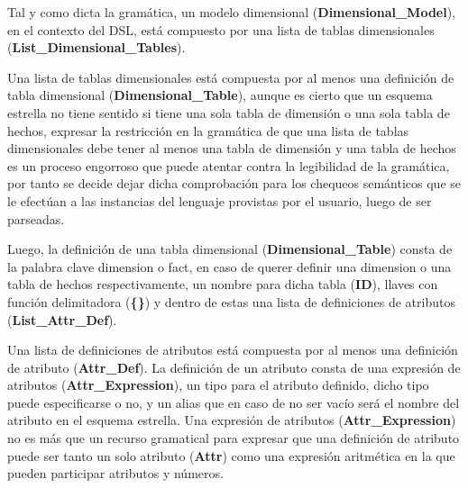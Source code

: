 
Tal y como dicta la gramática, un modelo dimensional (\textbf{Dimensional\_Model}), 
en el contexto del DSL, est\'a compuesto por una lista de tablas 
dimensionales (\textbf{List\_Dimensional\_Tables}). 

Una lista de tablas dimensionales est\'a compuesta por al menos una definici\'on de tabla dimensional 
(\textbf{Dimensional\_Table}), aunque es cierto que un esquema estrella no tiene sentido si tiene una sola tabla 
de dimensi\'on o una sola tabla de hechos, expresar la restricci\'on en la gramática de que una lista de 
tablas dimensionales debe tener al menos una tabla de dimensi\'on y una tabla de hechos es un proceso 
engorroso que puede atentar contra la legibilidad de la gramática, por tanto se decide dejar dicha 
comprobaci\'on para los chequeos sem\'anticos que se le efect\'uan a las instancias del lenguaje provistas 
por el usuario, luego de ser parseadas. 

Luego, la 
definición de una tabla dimensional (\textbf{Dimensional\_Table}) consta de la palabra clave dimension o fact, 
en caso de querer definir una dimension o una tabla de hechos respectivamente, un nombre para dicha tabla 
(\textbf{ID}), llaves con funci\'on delimitadora (\textbf{\{\}}) y dentro de estas una lista de definiciones de atributos
(\textbf{List\_Attr\_Def}). 

Una lista de definiciones de atributos est\'a compuesta por al menos una definición de atributo (\textbf{Attr\_Def}). 
La definición de un atributo consta de una expresión de atributos (\textbf{Attr\_Expression}), un tipo para el atributo 
definido, dicho tipo puede especificarse o no, y un alias que en caso de no ser vacío ser\'a el nombre del 
atributo en el esquema estrella. Una expresión de atributos (\textbf{Attr\_Expression}) no es m\'as que 
un recurso gramatical para expresar que una definición de atributo puede ser tanto un solo atributo (\textbf{Attr})
como una expresi\'on aritm\'etica en la que pueden participar atributos y n\'umeros. 

